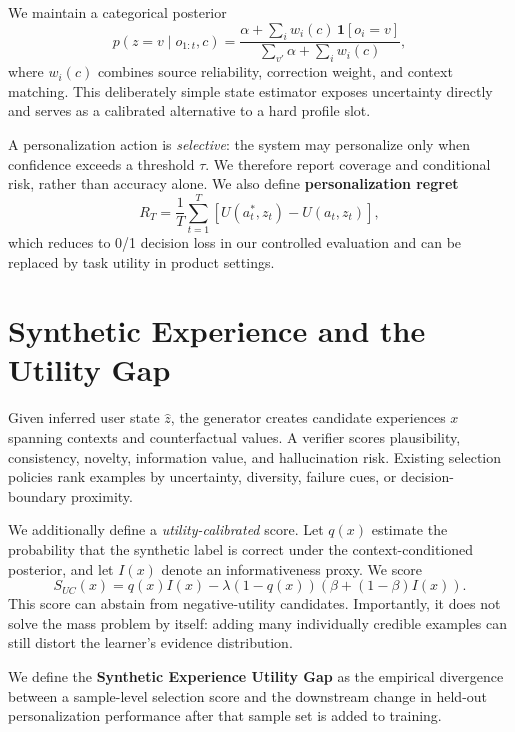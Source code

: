 \documentclass[10pt,twocolumn]{article}
\begin{document}
We maintain a categorical posterior
\begin{equation}
 p(z=v\mid o_{1:t},c) = \frac{\alpha + \sum_i w_i(c)\,\mathbf{1}[o_i=v]}{\sum_{v'}\alpha + \sum_i w_i(c)},
\end{equation}
where $w_i(c)$ combines source reliability, correction weight, and context matching. This deliberately simple state estimator exposes uncertainty directly and serves as a calibrated alternative to a hard profile slot.

A personalization action is \emph{selective}: the system may personalize only when confidence exceeds a threshold $\tau$. We therefore report coverage and conditional risk, rather than accuracy alone. We also define \textbf{personalization regret}
\begin{equation}
 R_T = \frac{1}{T}\sum_{t=1}^T \left[U(a_t^*,z_t)-U(a_t,z_t)\right],
\end{equation}
which reduces to 0/1 decision loss in our controlled evaluation and can be replaced by task utility in product settings.

\section{Synthetic Experience and the Utility Gap}
Given inferred user state $\hat z$, the generator creates candidate experiences $x$ spanning contexts and counterfactual values. A verifier scores plausibility, consistency, novelty, information value, and hallucination risk. Existing selection policies rank examples by uncertainty, diversity, failure cues, or decision-boundary proximity.

We additionally define a \emph{utility-calibrated} score. Let $q(x)$ estimate the probability that the synthetic label is correct under the context-conditioned posterior, and let $I(x)$ denote an informativeness proxy. We score
\begin{equation}
 S_{UC}(x)=q(x)I(x)-\lambda (1-q(x))(\beta+(1-\beta)I(x)).
\end{equation}
This score can abstain from negative-utility candidates. Importantly, it does not solve the mass problem by itself: adding many individually credible examples can still distort the learner's evidence distribution.

We define the \textbf{Synthetic Experience Utility Gap} as the empirical divergence between a sample-level selection score and the downstream change in held-out personalization performance after that sample set is added to training.
\end{document}
